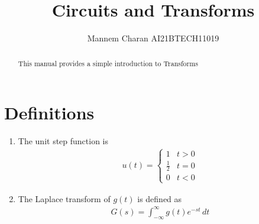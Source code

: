 \documentclass[journal,12pt,twocolumn]{IEEEtran}
\renewcommand\thesection{\arabic{section}}
\begin{document}
\let\StandardTheFigure\thefigure
\renewcommand{\thefigure}{\theproblem}



\def\putbox#1#2#3{\makebox[0in][l]{\makebox[#1][l]{}\raisebox{\baselineskip}[0in][0in]{\raisebox{#2}[0in][0in]{#3}}}}
     \def\rightbox#1{\makebox[0in][r]{#1}}
     \def\centbox#1{\makebox[0in]{#1}}
     \def\topbox#1{\raisebox{-\baselineskip}[0in][0in]{#1}}
     \def\midbox#1{\raisebox{-0.5\baselineskip}[0in][0in]{#1}}

\vspace{3cm}

\title{ 
Circuits and Transforms
}



\author{ Mannem Charan AI21BTECH11019 %
}
\maketitle


\tableofcontents


\renewcommand{\thefigure}{\theenumi}
\renewcommand{\thetable}{\theenumi}



\bigskip

\begin{abstract}
This manual provides a simple introduction to Transforms
\end{abstract}

 \section{Definitions}
\begin{enumerate}[label=\arabic*.,ref=\thesection.\theenumi]
\item The unit step function is 
\begin{align}
u(t) =
\begin{cases}
1 & t > 0
\\
	\frac{1}{2} & t = 0
\\
0 & t < 0
\end{cases}
\end{align}
\item The Laplace transform of $g(t)$ is defined as 
\begin{align}
	G(s) = \int_{-\infty}^{\infty} g(t) e^{-st}\, dt\label{eq:laplace}
\end{align}
 \end{enumerate}
\end{document}

